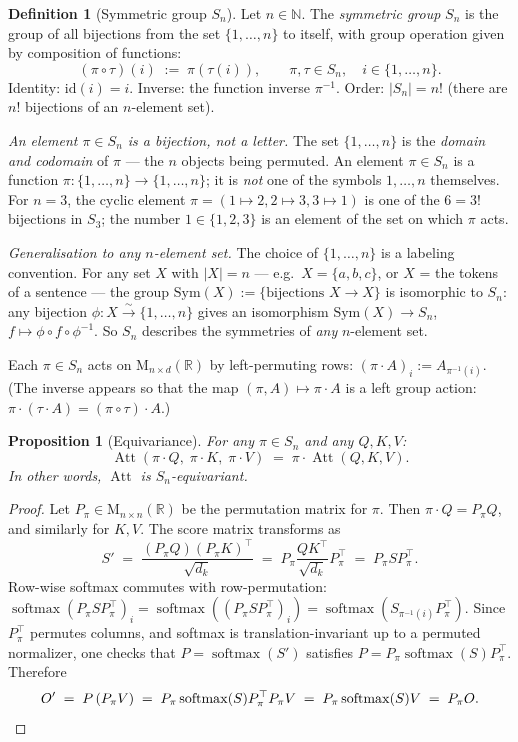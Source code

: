 \documentclass[11pt]{amsart}
\theoremstyle{plain}
\newtheorem{proposition}[theorem]{Proposition}
\theoremstyle{definition}
\newtheorem{definition}[theorem]{Definition}
\newcommand{\R}{\mathbb{R}}
\newcommand{\N}{\mathbb{N}}
\newcommand{\Mat}[2]{\mathrm{M}_{#1 \times #2}(\R)}
\newcommand{\softmax}{\operatorname{softmax}}
\newcommand{\Att}{\operatorname{Att}}
\begin{document}
\begin{definition}[Symmetric group $S_n$]
\label{def:sym-group}
Let $n \in \N$.  The \emph{symmetric group} $S_n$ is the group of all bijections
from the set $\{1,\ldots,n\}$ to itself, with group operation given by
composition of functions:
\[
    (\pi \circ \tau)(i) \;:=\; \pi(\tau(i)),
    \qquad \pi,\tau \in S_n,\quad i \in \{1,\ldots,n\}.
\]
Identity: $\mathrm{id}(i) = i$.  Inverse: the function inverse $\pi^{-1}$.
Order: $|S_n| = n!$ (there are $n!$ bijections of an $n$-element set).

\medskip
\textit{An element $\pi \in S_n$ is a bijection, not a letter.}
The set $\{1,\ldots,n\}$ is the \emph{domain and codomain} of $\pi$ — the
$n$ objects being permuted.  An element $\pi \in S_n$ is a function
$\pi: \{1,\ldots,n\}\to\{1,\ldots,n\}$; it is \emph{not} one of the symbols
$1,\ldots,n$ themselves.  For $n=3$, the cyclic element
$\pi = (1\mapsto 2, 2\mapsto 3, 3\mapsto 1)$ is one of the $6 = 3!$ bijections
in $S_3$; the number $1 \in \{1,2,3\}$ is an element of the set on which $\pi$
acts.

\medskip
\textit{Generalisation to any $n$-element set.}
The choice of $\{1,\ldots,n\}$ is a labeling convention.  For any set $X$ with
$|X| = n$ — e.g.\ $X = \{a,b,c\}$, or $X$ = the tokens of a sentence — the
group $\mathrm{Sym}(X) := \{\text{bijections } X\to X\}$ is isomorphic to $S_n$:
any bijection $\phi: X \xrightarrow{\sim} \{1,\ldots,n\}$ gives an isomorphism
$\mathrm{Sym}(X) \to S_n$, $f \mapsto \phi\circ f\circ\phi^{-1}$.  So $S_n$
describes the symmetries of \emph{any} $n$-element set.
\end{definition}

Each $\pi \in S_n$ acts on $\Mat{n}{d}$ by left-permuting rows:
$(\pi \cdot A)_i := A_{\pi^{-1}(i)}$.  (The inverse appears so that the map
$(\pi, A)\mapsto \pi\cdot A$ is a left group action:
$\pi\cdot(\tau\cdot A) = (\pi\circ\tau)\cdot A$.)

\begin{proposition}[Equivariance]
\label{prop:equivariance}
For any $\pi \in S_n$ and any $Q, K, V$:
\[
    \Att(\pi \cdot Q,\; \pi \cdot K,\; \pi \cdot V)
    \;=\; \pi \cdot \Att(Q, K, V).
\]
In other words, $\Att$ is $S_n$-equivariant.
\end{proposition}
\begin{proof}
Let $P_\pi \in \Mat{n}{n}$ be the permutation matrix for $\pi$.  Then
$\pi \cdot Q = P_\pi Q$, and similarly for $K, V$.  The score matrix transforms as
\[
    S' \;=\; \frac{(P_\pi Q)(P_\pi K)^\top}{\sqrt{d_k}}
        \;=\; P_\pi \frac{Q K^\top}{\sqrt{d_k}} P_\pi^\top
        \;=\; P_\pi S P_\pi^\top.
\]
Row-wise softmax commutes with row-permutation:
$\softmax(P_\pi S P_\pi^\top)_i = \softmax((P_\pi S P_\pi^\top)_i)
= \softmax(S_{\pi^{-1}(i)} P_\pi^\top)$.
Since $P_\pi^\top$ permutes columns, and softmax is translation-invariant
up to a permuted normalizer, one checks that $P = \softmax(S')$ satisfies
$P = P_\pi \softmax(S) P_\pi^\top$.  Therefore
\[
    O' \;=\; P\,(P_\pi V) \;=\; P_\pi \softmax(S) P_\pi^\top P_\pi V
         \;=\; P_\pi \softmax(S) V \;=\; P_\pi O. \qedhere
\]
\end{proof}
\end{document}
